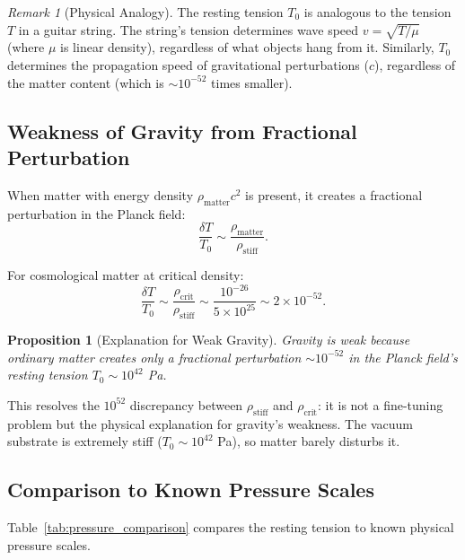 \documentclass[11pt,a4paper]{article}
\newcommand{\rhocrit}{\ensuremath{\rho_{\mathrm{crit}}}}
\newcommand{\rhostiff}{\ensuremath{\rho_{\mathrm{stiff}}}}
\newcommand{\Tzero}{\ensuremath{T_0}}
\newtheorem{proposition}[theorem]{Proposition}
\theoremstyle{definition}
\theoremstyle{remark}
\newtheorem{remark}[theorem]{Remark}
\begin{document}
\begin{remark}[Physical Analogy]
The resting tension $\Tzero$ is analogous to the tension $T$ in a guitar string. The string's tension determines wave speed $v = \sqrt{T/\mu}$ (where $\mu$ is linear density), regardless of what objects hang from it. Similarly, $\Tzero$ determines the propagation speed of gravitational perturbations ($c$), regardless of the matter content (which is $\sim 10^{-52}$ times smaller).
\end{remark}

\subsection{Weakness of Gravity from Fractional Perturbation}
\label{sec:weakness_gravity}

When matter with energy density $\rho_{\mathrm{matter}}c^2$ is present, it creates a fractional perturbation in the Planck field:
\begin{equation}
\label{eq:fractional_perturbation}
\frac{\delta T}{\Tzero} \sim \frac{\rho_{\mathrm{matter}}}{\rhostiff}.
\end{equation}

For cosmological matter at critical density:
\begin{equation}
\frac{\delta T}{\Tzero} \sim \frac{\rhocrit}{\rhostiff} \sim \frac{10^{-26}}{5 \times 10^{25}} \sim 2 \times 10^{-52}.
\end{equation}

\begin{proposition}[Explanation for Weak Gravity]
\label{prop:weak_gravity}
Gravity is weak because ordinary matter creates only a fractional perturbation $\sim 10^{-52}$ in the Planck field's resting tension $\Tzero \sim 10^{42}$ Pa.
\end{proposition}

This resolves the $10^{52}$ discrepancy between $\rhostiff$ and $\rhocrit$: it is not a fine-tuning problem but the physical explanation for gravity's weakness. The vacuum substrate is extremely stiff ($\Tzero \sim 10^{42}$ Pa), so matter barely disturbs it.

\subsection{Comparison to Known Pressure Scales}
\label{sec:pressure_scales}

Table~\ref{tab:pressure_comparison} compares the resting tension to known physical pressure scales.
\end{document}
